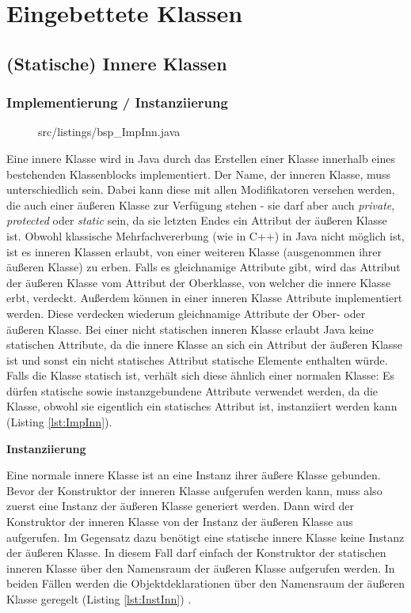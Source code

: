 \chapter{Eingebettete Klassen}
\section{(Statische) Innere Klassen}
\subsection {Implementierung / Instanziierung}

\begin{figure}[H]
\lstset{language=Java}
 {src/listings/bsp_ImpInn.java}
\end{figure}
\newpage
Eine innere Klasse wird in Java durch das Erstellen einer Klasse innerhalb eines bestehenden Klassenblocks implementiert.
Der Name, der inneren Klasse, muss unterschiedlich sein. Dabei kann diese mit allen Modifikatoren versehen werden, die auch einer äußeren Klasse zur Verfügung stehen - sie darf aber auch {\it private}, {\it protected} oder {\it static} sein, da sie letzten Endes ein Attribut der äußeren Klasse ist.
Obwohl klassische Mehrfachvererbung (wie in C++) in Java nicht möglich ist, ist es inneren Klassen erlaubt, von einer weiteren Klasse (ausgenommen ihrer äußeren Klasse) zu erben.
Falls es gleichnamige Attribute gibt, wird das Attribut der äußeren Klasse vom Attribut der Oberklasse, von welcher die innere Klasse erbt, verdeckt.
Außerdem können in einer inneren Klasse Attribute implementiert werden. Diese verdecken wiederum gleichnamige Attribute der Ober- oder äußeren Klasse.
Bei einer nicht statischen inneren Klasse erlaubt Java keine statischen Attribute, da die innere Klasse an sich ein Attribut der äußeren Klasse ist und sonst ein nicht statisches Attribut statische Elemente enthalten würde.
Falls die Klasse statisch ist, verhält sich diese ähnlich einer normalen Klasse: Es dürfen statische sowie instanzgebundene Attribute verwendet werden, da die Klasse, obwohl sie eigentlich ein statisches Attribut ist, instanziiert werden kann (Listing \ref{lst:ImpInn}).


{\bf Instanziierung}

Eine normale innere Klasse ist an eine Instanz ihrer äußere Klasse gebunden. Bevor der Konstruktor der inneren Klasse aufgerufen werden kann, muss also zuerst eine Instanz der äußeren Klasse generiert werden.
Dann wird der Konstruktor der inneren Klasse von der Instanz der äußeren Klasse aus aufgerufen.
Im Gegensatz dazu benötigt eine statische innere Klasse keine Instanz der äußeren Klasse.
In diesem Fall darf einfach der Konstruktor der statischen inneren Klasse über den Namensraum der äußeren Klasse aufgerufen werden.
In beiden Fällen werden die Objektdeklarationen über den Namensraum der äußeren Klasse geregelt (Listing \ref{lst:InstInn}) \cite{goll2013java}.

